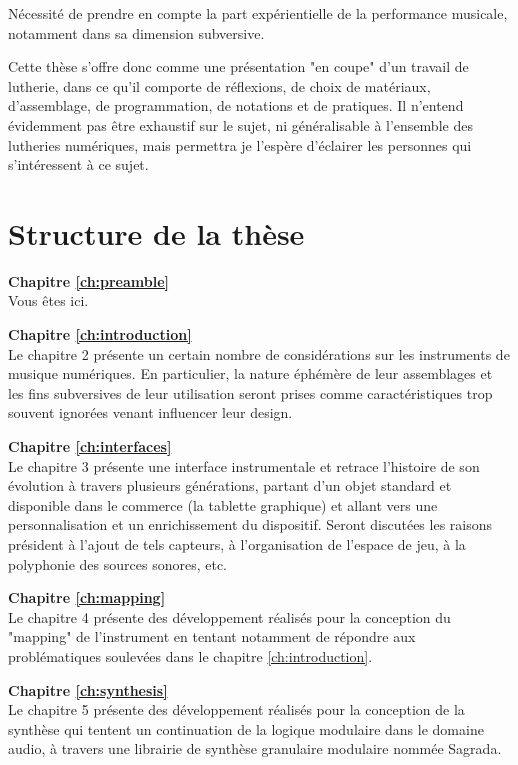 Nécessité de prendre en compte la part expérientielle de la performance musicale, notamment dans sa dimension subversive.

Cette thèse s'offre donc comme une présentation "en coupe" d'un travail de lutherie, dans ce qu'il comporte de réflexions, de choix de matériaux, d'assemblage, de programmation, de notations et de pratiques. Il n'entend évidemment pas être exhaustif sur le sujet, ni généralisable à l'ensemble des lutheries numériques, mais permettra je l'espère d'éclairer les personnes qui s'intéressent à ce sujet.


\section{Structure de la thèse}
\label{sec:preamble:structure}

\textbf{Chapitre \ref{ch:preamble}} \\[0.2em]
Vous êtes ici.

\textbf{Chapitre \ref{ch:introduction}} \\[0.2em]
Le chapitre 2 présente un certain nombre de considérations sur les instruments de musique numériques. En particulier, la nature
éphémère de leur assemblages et les fins subversives de leur utilisation seront prises comme caractéristiques trop souvent ignorées venant influencer leur design.

\textbf{Chapitre \ref{ch:interfaces}} \\[0.2em]
Le chapitre 3 présente une interface instrumentale et retrace l'histoire de son évolution à travers plusieurs générations, partant d'un objet standard et disponible dans le commerce (la tablette graphique) et allant vers une personnalisation et un enrichissement du dispositif. 
Seront discutées les raisons président à l'ajout de tels capteurs, à l'organisation de l'espace de jeu, à la polyphonie des sources sonores, etc.

\textbf{Chapitre \ref{ch:mapping}} \\[0.2em]
Le chapitre 4 présente des développement réalisés pour la conception du "mapping" de l'instrument en tentant notamment de répondre aux problématiques soulevées dans le chapitre \ref{ch:introduction}.

\textbf{Chapitre \ref{ch:synthesis}} \\[0.2em]
Le chapitre 5 présente des développement réalisés pour la conception de la synthèse qui tentent un continuation de la logique modulaire dans le domaine audio, à travers une librairie de synthèse granulaire modulaire nommée Sagrada.

